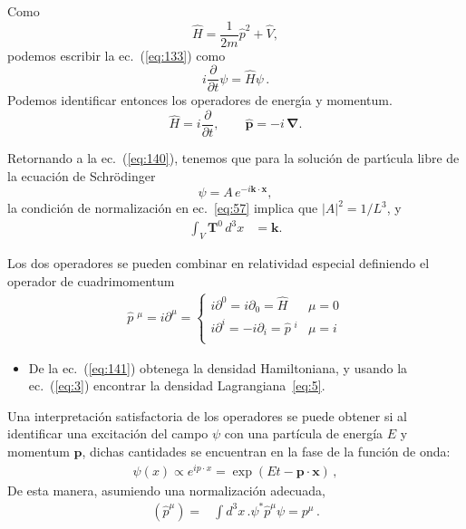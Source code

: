 Como
\begin{equation}
  \widehat H=\frac{1}{2m}\hat p^2+\widehat V,
\end{equation}
podemos escribir la ec.~(\ref{eq:133}) como
\begin{equation}
  i\frac{\partial}{\partial t}\psi=\widehat H \psi\,.
\end{equation}
Podemos identificar entonces los operadores de energ\'\i a y momentum.
\begin{equation}
  \label{eq:151}
  \widehat H=i\frac{\partial}{\partial t},\qquad \hat{\mathbf{p}}=-i\,\boldsymbol{\nabla}.
\end{equation}

Retornando a la ec.~(\ref{eq:140}), tenemos que para la soluci\'on de part\'\i cula libre de la ecuaci\'on de Schr\"odinger 
\begin{equation}
  \psi=A\,e^{-i\mathbf{k}\cdot\mathbf{x}},
\end{equation}
la condici\'on de normalizaci\'on en ec.~\eqref{eq:57} implica que $|A|^2=1/L^3$, y
\begin{align}
  \int_V \mathbf{T}^0\, d^3x&=\mathbf{k}.
\end{align}

Los dos operadores se pueden combinar en relatividad especial definiendo el operador de cuadrimomentum
\begin{align}
  \widehat{p}\;^{\mu}=i\partial^{\mu}=
  \begin{cases}
    i\partial^0=i\partial_0=\widehat{H} & \mu=0\\
    i\partial^i=-i\partial_i=\widehat{p}\;^{i} & \mu=i\\
  \end{cases}
\end{align}


\begin{itemize}
\item[\textbf{Ejercicio:}]  De la ec.~(\ref{eq:141}) obtenega la densidad Hamiltoniana, y usando la ec.~(\ref{eq:3}) encontrar la densidad Lagrangiana~\eqref{eq:5}.
\end{itemize}

Una interpretación satisfactoria de los operadores se puede obtener si al identificar una excitación del campo $\psi$ con una partícula de energía $E$ y momentum $\mathbf{p}$, dichas cantidades se encuentran en la fase de la función de onda:
\begin{align}
  \psi(x)\propto e^{i p\cdot x}=\exp(Et-\mathbf{p}\cdot \mathbf{x})\,,
\end{align}
De esta manera, asumiendo una normalización adecuada,
\begin{align}
  \left( \widehat{p}^{\mu} \right)=&\int d^{3}x\,. \psi^{*}\widehat{p}^{\mu}\psi=p^{\mu}\,.
\end{align}

